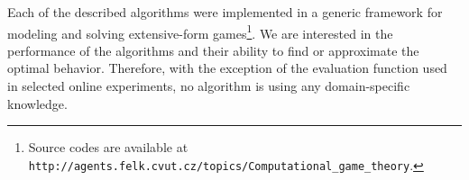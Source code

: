 Each of the described algorithms were implemented in a generic framework for modeling and solving extensive-form games\footnote{Source codes are available at \texttt{http://agents.felk.cvut.cz/topics/Computational\_\newline game\_theory}.}.
We are interested in the performance of the algorithms and their ability to find or approximate the optimal behavior.
Therefore, with the exception of the evaluation function used in selected online experiments, no algorithm is using any domain-specific knowledge.



